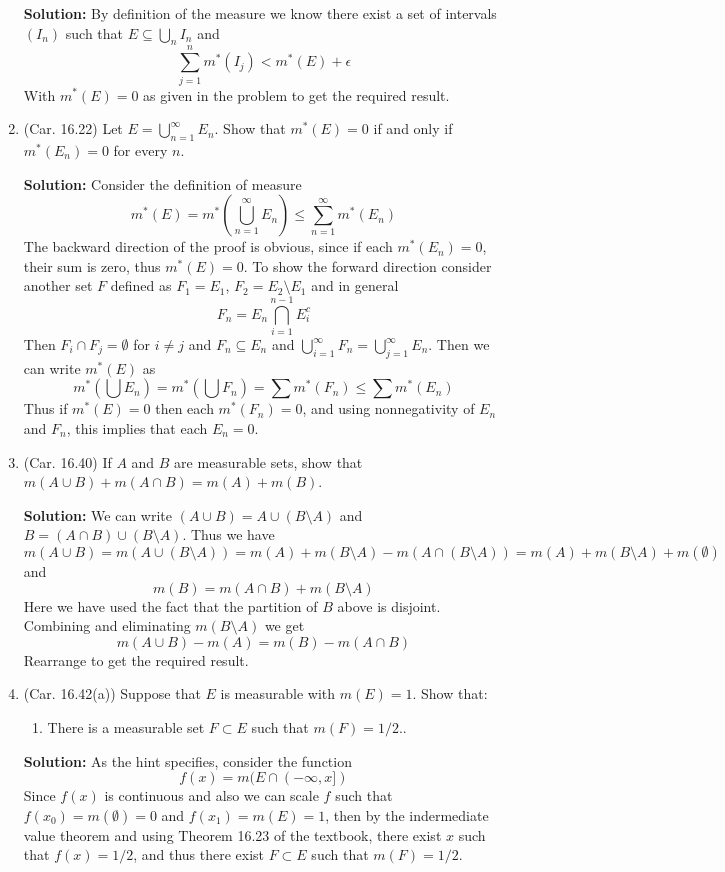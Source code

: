 \documentclass{article}
\def\le{\leqslant}
\begin{document}
\begin{enumerate}
\textbf{Solution:} By definition of the measure we know there exist
a set of intervals $(I_n)$ such that $E\subseteq \bigcup_n I_n$ and
\[
\sum_{j=1}^n m^*(I_j) < m^*(E) + \epsilon 
\]
With $m^*(E)=0$ as given in the problem to get the required result.

\item (Car. 16.22) Let $E=\bigcup_{n=1}^\infty E_n$. Show that $m^*(E)=0$ if and only if $m^*(E_n)=0$ for every $n$.

\textbf{Solution:} Consider the definition of measure
\[
m^*(E) = m^*(\bigcup_{n=1}^\infty E_n) \le \sum_{n=1}^\infty m^*(E_n)
\]
The backward direction of the proof is obvious, since if each $m^*(E_n)=0$,
their sum is zero, thus $m^*(E)=0$. To show the forward direction
consider another set $F$ defined as 
 $F_1 = E_1$, $F_2 = E_2\setminus E_1$ and in general
\[
F_n = E_n \bigcap_{i=1}^{n-1} E_i^c
\]
Then $F_i \cap F_j = \emptyset$ for $i\ne j$ and $F_n \subseteq E_n$
and $\bigcup_{i=1}^\infty F_n = \bigcup_{j=1}^\infty E_n$.
Then we can write $m^*(E)$ as
\[
m^*(\bigcup E_n) = m^*(\bigcup F_n) = \sum m^*(F_n) \le \sum m^*(E_n)
\]
Thus if $m^*(E)=0$ then each $m^*(F_n)=0$, and using nonnegativity of
$E_n$ and $F_n$, this implies that each $E_n=0$.
 
\item (Car. 16.40) If $A$ and $B$ are measurable sets, show that $m(A\cup B)+m(A\cap B)=m(A)+m(B)$.

\textbf{Solution:} We can write $(A\cup B)=A\cup (B\setminus A)$ and
$B = (A \cap B) \cup (B\setminus A)$.
Thus we have
\[
m(A\cup B) = m(A\cup (B\setminus A)) = m(A) + m(B\setminus A) - m( A \cap ( B \setminus A ) ) = m(A) + m(B\setminus A) + m(\emptyset)
\]
and
\[
m(B) = m(A\cap B) + m(B\setminus A) 
\]
Here we have used the fact that the partition of $B$ above is disjoint.
Combining and eliminating $m(B\setminus A)$ we get 
\[
m(A\cup B) - m(A) = m(B) - m(A\cap B)
\]
Rearrange to get the required result.

\item (Car. 16.42(a)) Suppose that $E$ is measurable with $m(E)=1$. Show that:
  \begin{enumerate}
    \item There is a measurable set $F \subset E$ such that $m(F)=1/2.$.
  \end{enumerate}

  \textbf{Solution:} As the hint specifies, consider the function
  \[
  f(x) = m(E\cap (-\infty,x])
  \] Since $f(x)$ is continuous and also we can scale $f$ such that 
$f(x_0)=m(\emptyset)=0$ and $f(x_1)=m(E)=1$, then by the indermediate value theorem and
using Theorem 16.23 of the textbook, there
exist $x$ such that $f(x)=1/2$, and thus there exist $F\subset E$ 
such that $m(F)=1/2$.


\end{enumerate}
\end{document}

